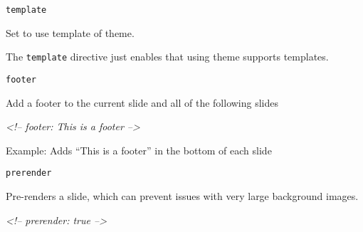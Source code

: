 \documentclass[ignorenonframetext,]{beamer}
\newenvironment{Shaded}{\begin{snugshade}}{\end{snugshade}}
\newcommand{\CommentTok}[1]{\textcolor[rgb]{0.56,0.35,0.01}{\textit{{#1}}}}
\newcommand{\NormalTok}[1]{{#1}}
\begin{document}
\begin{frame}[fragile]

\begin{block}{\texttt{template}}

Set to use template of theme.

The \texttt{template} directive just enables that using theme supports
templates.

\begin{Shaded}
\end{Shaded}

\end{block}

\end{frame}

\begin{frame}[fragile]

\begin{block}{\texttt{footer}}

Add a footer to the current slide and all of the following slides

\begin{Shaded}
\begin{Highlighting}[]
\CommentTok{<!-- footer: This is a footer -->}
\end{Highlighting}
\end{Shaded}

Example: Adds ``This is a footer'' in the bottom of each slide

\end{block}

\end{frame}

\begin{frame}[fragile]

\begin{block}{\texttt{prerender}}

Pre-renders a slide, which can prevent issues with very large background
images.

\begin{Shaded}
\begin{Highlighting}[]
\CommentTok{<!-- prerender: true -->}
\end{Highlighting}
\end{Shaded}

\end{block}

\end{frame}
\end{document}
